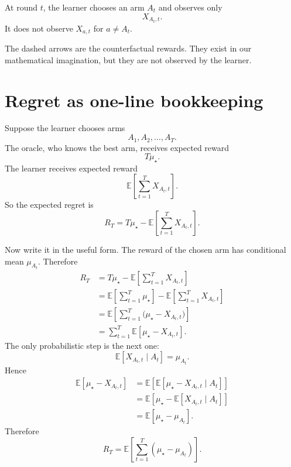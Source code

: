 \documentclass[en,nofont,11pt]{elegantbook}
\newcommand{\E}{\mathbb{E}}
\begin{document}
At round $t$, the learner chooses an arm $A_t$ and observes only
\[
X_{A_t,t}.
\]
It does not observe $X_{a,t}$ for $a\ne A_t$.

\begin{center}
\end{center}

The dashed arrows are the counterfactual rewards.  They exist in our mathematical imagination, but they are not observed by the learner.

\section{Regret as one-line bookkeeping}

Suppose the learner chooses arms
\[
A_1,A_2,\ldots,A_T.
\]
The oracle, who knows the best arm, receives expected reward
\[
T\mu_\star.
\]
The learner receives expected reward
\[
\E\left[\sum_{t=1}^T X_{A_t,t}\right].
\]
So the expected regret is
\[
R_T
=
T\mu_\star
-
\E\left[\sum_{t=1}^T X_{A_t,t}\right].
\]

Now write it in the useful form.  The reward of the chosen arm has conditional mean $\mu_{A_t}$.  Therefore
\[
\begin{aligned}
R_T
&=
T\mu_\star
-
\E\left[\sum_{t=1}^T X_{A_t,t}\right] \\[0.3em]
&=
\E\left[\sum_{t=1}^T \mu_\star\right]
-
\E\left[\sum_{t=1}^T X_{A_t,t}\right] \\[0.3em]
&=
\E\left[\sum_{t=1}^T \bigl(\mu_\star-X_{A_t,t}\bigr)\right] \\[0.3em]
&=
\sum_{t=1}^T
\E\left[\mu_\star-X_{A_t,t}\right].
\end{aligned}
\]
The only probabilistic step is the next one:
\[
\E[X_{A_t,t}\mid A_t]=\mu_{A_t}.
\]
Hence
\[
\begin{aligned}
\E\left[\mu_\star-X_{A_t,t}\right]
&=
\E\left[
\E\left[\mu_\star-X_{A_t,t}\mid A_t\right]
\right] \\[0.3em]
&=
\E\left[
\mu_\star-\E[X_{A_t,t}\mid A_t]
\right] \\[0.3em]
&=
\E\left[\mu_\star-\mu_{A_t}\right].
\end{aligned}
\]
Therefore
\[
\boxed{
R_T=
\E\left[\sum_{t=1}^T(\mu_\star-\mu_{A_t})\right].
}
\]
\end{document}
